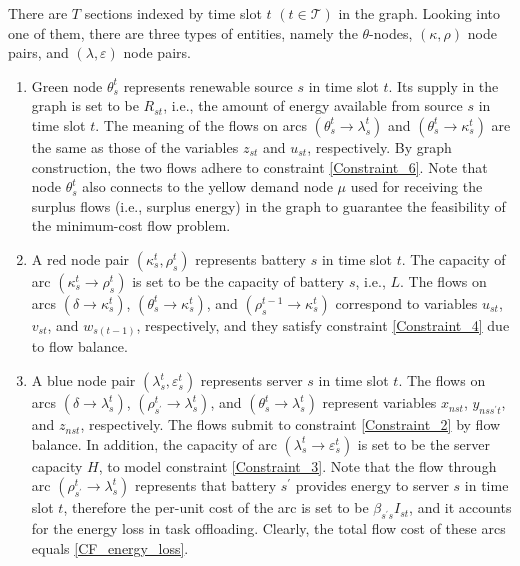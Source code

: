 \documentclass[conference, 10pt, ﬁnal, letterpaper, twocolumn]{IEEEtran}
\begin{document}
There are $T$ sections indexed by time slot $t$ $(t\in \mathcal{T})$ in the graph. Looking into one of them, there are three types of entities, namely the $\theta$-nodes, $(\kappa, \rho)$ node pairs, and $(\lambda, \varepsilon)$ node pairs.
\begin{enumerate}
    \item Green node $\theta^{t}_{s}$ represents renewable source $s$ in time slot $t$. Its supply in the graph is set to be $R_{st}$, i.e., the amount of energy available from source $s$ in time slot $t$. The meaning of the flows on arcs $(\theta^{t}_{s}\rightarrow \lambda^{t}_{s})$ and $(\theta^{t}_{s}\rightarrow \kappa^{t}_{s})$ are the same as those of the variables $z_{st}$ and $u_{st}$, respectively. By graph construction, the two flows adhere to constraint \eqref{Constraint_6}. Note that node $\theta^{t}_{s}$ also connects to the yellow demand node $\mu$ used for receiving the surplus flows (i.e., surplus energy) in the graph to guarantee the feasibility of the minimum-cost flow problem.
    \item A red node pair $(\kappa^{t}_{s}, \rho^{t}_{s})$ represents battery $s$ in time slot $t$. The capacity of arc $(\kappa^{t}_{s}\rightarrow \rho^{t}_{s})$ is set to be the capacity of battery $s$, i.e., $L$. The flows on arcs $(\delta \rightarrow \kappa^{t}_{s})$, $(\theta^{t}_{s} \rightarrow \kappa^{t}_{s})$, and $(\rho^{t-1}_{s}\rightarrow \kappa^{t}_{s})$ correspond to variables $u_{st}$, $v_{st}$, and $w_{s(t-1)}$, respectively, and they satisfy constraint \eqref{Constraint_4} due to flow balance.
    \item A blue node pair $(\lambda^{t}_{s}, \varepsilon^{t}_{s})$ represents server $s$ in time slot $t$. The flows on arcs $(\delta \rightarrow \lambda^{t}_{s})$, $(\rho^{t}_{s^\prime} \rightarrow \lambda^{t}_{s})$, and $(\theta^{t}_{s} \rightarrow \lambda^{t}_{s} )$ represent variables $x_{nst}$, $y_{nss^\prime t}$, and $z_{nst}$, respectively. The flows submit to constraint \eqref{Constraint_2} by flow balance. In addition, the capacity of arc $(\lambda^{t}_{s}\rightarrow\varepsilon^{t}_{s})$ is set to be the server capacity $H$, to model constraint \eqref{Constraint_3}. Note that the flow through arc $(\rho^{t}_{s^\prime}\rightarrow\lambda^{t}_{s})$ represents that battery $s^\prime$ provides energy to server $s$ in time slot $t$, therefore the per-unit cost of the arc is set to be $\beta_{s^\prime s} I_{st}$, and it accounts for the energy loss in task offloading. Clearly, the total flow cost of these arcs equals \eqref{CF_energy_loss}.
\end{enumerate}
\end{document}
